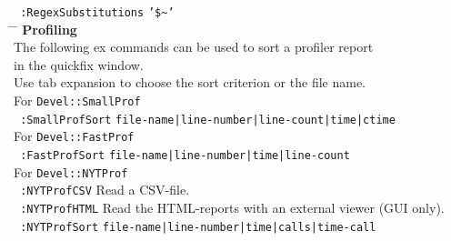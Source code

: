 \documentclass[oneside,10pt,landscape,DIV17]{scrartcl}
\begin{document}
\begin{multicols}{2}
{\begin{tabbing}
\texttt{ :RegexSubstitutions}   \> \texttt{'\$}\texttt{\~}\texttt{'}  \\[2.5ex]
%
\hspace{30mm} \= \hspace{50mm} \= \kill
%
\large{\textbf{Profiling}}\\[1.0ex]
%
The following ex commands can be used to sort a profiler report \\in the quickfix window.\\
Use tab expansion to choose the sort criterion or the file name.\\[2.0ex]
%
For \texttt{Devel::SmallProf}\\[1.0ex]
\texttt{ :SmallProfSort}   \> \texttt{file-name|line-number|line-count|time|ctime}\\[1.0ex]
%
%
For \texttt{Devel::FastProf}\\[1.0ex]
\texttt{ :FastProfSort}    \> \texttt{file-name|line-number|time|line-count}\\[1.0ex]
%
%
For \texttt{Devel::NYTProf}\\[1.0ex]
\texttt{ :NYTProfCSV}      \> Read a CSV-file.\\[1.0ex]
%
\texttt{ :NYTProfHTML}      \> Read the HTML-reports with an external viewer (GUI only).\\[1.0ex]
%
%
\texttt{ :NYTProfSort}     \> \texttt{file-name|line-number|time|calls|time-call}\\
%
\end{tabbing}
}
\end{multicols}%
%
\end{document}

